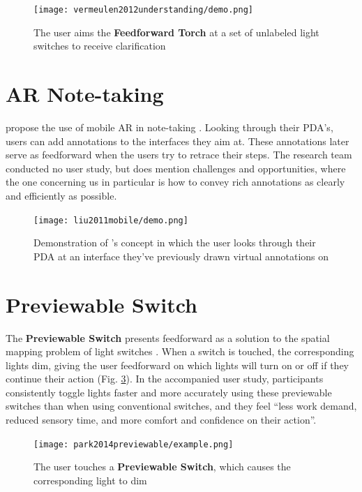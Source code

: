 \begin{figure}
    \centering
    \texttt{[image: vermeulen2012understanding/demo.png]}
    \caption{The user aims the \textbf{Feedforward Torch} at a set of unlabeled light switches to receive clarification \cite{vermeulen2012understanding}}
    \label{fig:vermeulen2012understanding_demo}
\end{figure}

\section{AR Note-taking} \label{sec:relat:ar_note-taking}
\textbf{\citeauthor{liu2011mobile}} propose the use of mobile AR in note-taking \cite{liu2011mobile}. Looking through their PDA's, users can add annotations to the interfaces they aim at. These annotations later serve as feedforward when the users try to retrace their steps. The research team conducted no user study, but does mention challenges and opportunities, where the one concerning us in particular is how to convey rich annotations as clearly and efficiently as possible.

\begin{figure}
    \centering
    \texttt{[image: liu2011mobile/demo.png]}
    \caption{Demonstration of \textbf{\citeauthor{liu2011mobile}}'s concept in which the user looks through their PDA at an interface they've previously drawn virtual annotations on \cite{liu2011mobile}}
    \label{fig:liu2011mobile_demo}
\end{figure}

\section{Previewable Switch} \label{sec:relat:previewable_switch}
The \textbf{Previewable Switch} presents feedforward as a solution to the spatial mapping problem of light switches \cite{park2014previewable}. When a switch is touched, the corresponding lights dim, giving the user feedforward on which lights will turn on or off if they continue their action (Fig. \ref{fig:park2014previewable_demo}). In the accompanied user study, participants consistently toggle lights faster and more accurately using these previewable switches than when using conventional switches, and they feel ``less work demand, reduced sensory time, and more comfort and confidence on their action''.

\begin{figure}
    \centering
    \texttt{[image: park2014previewable/example.png]}
    \caption{The user touches a \textbf{Previewable Switch}, which causes the corresponding light to dim \cite{park2014previewable}}
    \label{fig:park2014previewable_demo}
\end{figure}

